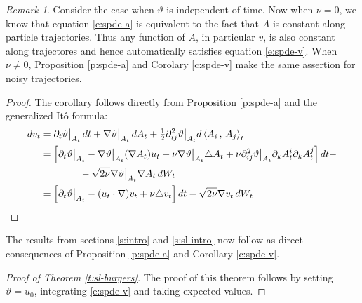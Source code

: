 \documentclass[final]{amsart}%
\newcommand{\del}{\partial}
\newcommand{\lap}{\triangle}
\newcommand{\grad}{\nabla}
\newcommand{\at}[1]{\big|_{#1}}
\newif\iftextstyle
\newcommand{\qv}[2]{\iftextstyle\langle#1,#2\rangle\else\left\langle#1\,,\,#2\right\rangle\fi}
\numberwithin{equation}{section}
\theoremstyle{definition}
\theoremstyle{remark}
\newtheorem{rem}[theorem]{Remark}
\begin{document}
\begin{rem}\label{r:traj-const}
Consider the case when $\vartheta$ is independent of time. Now when $\nu = 0$, we know that equation \eqref{e:spde-a} is equivalent to the fact that $A$ is constant along particle trajectories. Thus any function of $A$, in particular $v$, is also constant along trajectores and hence automatically satisfies equation \eqref{e:spde-v}. When $\nu \neq 0$, Proposition \ref{p:spde-a} and Corolary \ref{c:spde-v} make the same assertion for noisy trajectories.
\end{rem}
\begin{proof}
The corollary follows directly from Proposition \ref{p:spde-a} and the generalized It\^o formula:
\begin{align*}
dv_t &= \del_t \vartheta\at{A_t}\,dt + \grad \vartheta\at{A_t} \,dA_t + \tfrac{1}{2} \del^2_{ij} \vartheta\at{A_t} d\qv{A_i}{A_j}_t\\
    &= \left[ \del_t \vartheta\at{A_t}-\grad \vartheta\at{A_t} (\grad A_t) u_t + \nu \grad \vartheta\at{A_t} \lap A_t + \nu \del^2_{ij} \vartheta\at{A_t} \del_k A^i_t \del_k A^j_t \right] dt -\\
    &\qquad\qquad - \sqrt{2\nu} \grad \vartheta\at{A_t} \grad A_t \,dW_t\\
    &= \left[ \del_t \vartheta\at{A_t}-(u_t \cdot \grad) v_t + \nu \lap v_t \right] dt- \sqrt{2\nu} \grad v_t \,dW_t\qedhere
\end{align*}
\end{proof}%

The results from sections \ref{s:intro} and \ref{s:sl-intro} now follow as direct consequences of Proposition \ref{p:spde-a} and Corollary \ref{c:spde-v}.
\begin{proof}[Proof of Theorem \ref{t:sl-burgers}]%
The proof of this theorem follows by setting $\vartheta = u_0$, integrating \eqref{e:spde-v} and taking expected values.
\end{proof}
\end{document}
